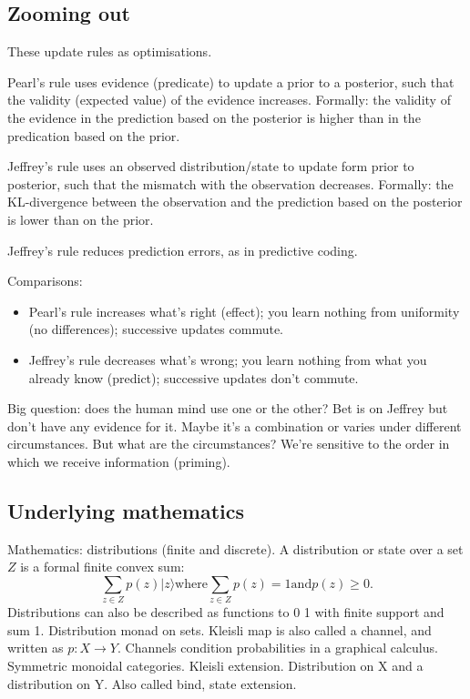 \subsection*{Zooming out}

These update rules as optimisations.

Pearl's rule uses evidence (predicate) to update a prior to a posterior, such that the
validity (expected value) of the evidence increases.
Formally: the validity of the evidence in the prediction based on the posterior is
higher than in the predication based on the prior.

Jeffrey's rule uses an observed distribution/state to update form prior to posterior,
such that the mismatch with the observation decreases.
Formally: the KL-divergence between the observation and the prediction based on the
posterior is lower than on the prior.

Jeffrey's rule reduces prediction errors, as in predictive coding.

Comparisons:
\begin{itemize}
  \item Pearl's rule increases what's right (effect); you learn nothing from uniformity (no differences); successive updates commute.
  \item Jeffrey's rule decreases what's wrong; you learn nothing from what you already know (predict); successive updates don't commute.
\end{itemize}

Big question: does the human mind use one or the other?
Bet is on Jeffrey but don't have any evidence for it.
Maybe it's a combination or varies under different circumstances.
But what are the circumstances?
We're sensitive to the order in which we receive information (priming).

\subsection*{Underlying mathematics}

\newcommand{\ket}[1]{\lvert #1 \rangle}

Mathematics: distributions (finite and discrete).
A distribution or state over a set $Z$ is a formal finite convex sum:
\begin{equation*}
  \sum_{z \in Z} p(z) \ket{z} \text{where} \sum_{z \in Z} p(z) = 1 \text{and} p(z) \geq 0.
\end{equation*}
Distributions can also be described as functions to 0 1 with finite support and sum 1.
Distribution monad on sets.
Kleisli map is also called a channel, and written as $p \colon X \to Y$.
Channels condition probabilities in a graphical calculus.
Symmetric monoidal categories.
Kleisli extension.
Distribution on X and a distribution on Y.
Also called bind, state extension.

